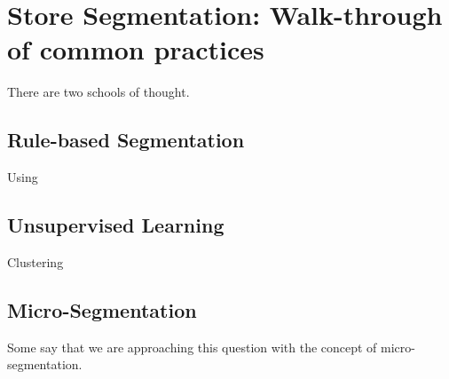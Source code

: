 \section{Store Segmentation: Walk-through of common practices}

There are two schools of thought.  

\subsection{Rule-based Segmentation}

Using 

\subsection{Unsupervised Learning}

Clustering 

\subsection{Micro-Segmentation}

Some say that we are approaching this question with the concept of micro-segmentation.  

\newpage